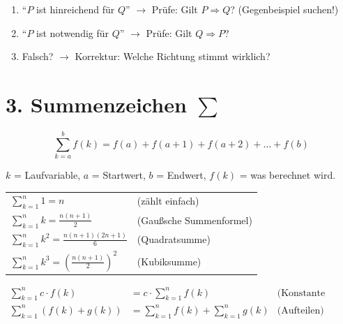 \documentclass[10pt, a4paper]{article}
\begin{document}
\begin{warnbox}[So pr\"ufst du es]
\begin{enumerate}
    \item "`$P$ ist hinreichend f\"ur $Q$"' $\rightarrow$ Pr\"ufe: Gilt $P \Rightarrow Q$? (Gegenbeispiel suchen!)
    \item "`$P$ ist notwendig f\"ur $Q$"' $\rightarrow$ Pr\"ufe: Gilt $Q \Rightarrow P$?
    \item Falsch? $\rightarrow$ Korrektur: Welche Richtung stimmt wirklich?
\end{enumerate}
\end{warnbox}

\section*{3. Summenzeichen $\sum$}

\begin{defbox}[Grundform]
\[
    \sum_{k=a}^{b} f(k) = f(a) + f(a+1) + f(a+2) + \ldots + f(b)
\]

$k$ = Laufvariable, $a$ = Startwert, $b$ = Endwert, $f(k)$ = was berechnet wird.
\end{defbox}

\begin{defbox}
\renewcommand{\arraystretch}{1.8}
\begin{tabular}{ll}
    $\displaystyle\sum_{k=1}^{n} 1 = n$ & (z\"ahlt einfach) \\
    $\displaystyle\sum_{k=1}^{n} k = \frac{n(n+1)}{2}$ & (Gau\ss{}sche Summenformel) \\
    $\displaystyle\sum_{k=1}^{n} k^2 = \frac{n(n+1)(2n+1)}{6}$ & (Quadratsumme) \\
    $\displaystyle\sum_{k=1}^{n} k^3 = \left(\frac{n(n+1)}{2}\right)^2$ & (Kubiksumme)
\end{tabular}
\end{defbox}

\begin{tipbox}[Rechenregeln]
\begin{align*}
    \sum_{k=1}^{n} c \cdot f(k) &= c \cdot \sum_{k=1}^{n} f(k) & \text{(Konstante rausziehen)} \\[4pt]
    \sum_{k=1}^{n} \left(f(k) + g(k)\right) &= \sum_{k=1}^{n} f(k) + \sum_{k=1}^{n} g(k) & \text{(Aufteilen)}
\end{align*}
\end{tipbox}
\end{document}
